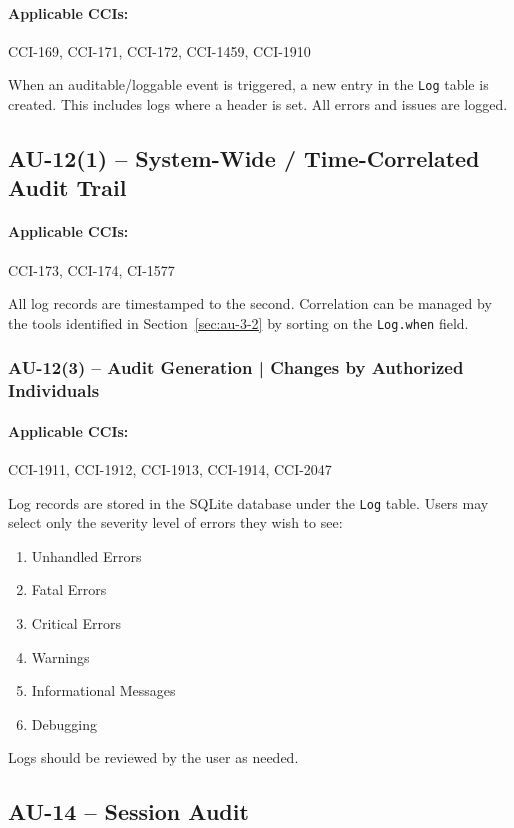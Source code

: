 \documentclass[letterpaper, 10pt, twoside]{article}
\begin{document}
\paragraph{Applicable CCIs:} CCI-169, CCI-171, CCI-172, CCI-1459, CCI-1910

When an auditable/loggable event is triggered, a new entry in the \texttt{Log} table is created. This includes logs where a header is set. All errors and issues are logged.

\subsection{AU-12(1) -- System-Wide / Time-Correlated Audit Trail}

\paragraph{Applicable CCIs:} CCI-173, CCI-174, CI-1577

All log records are timestamped to the second. Correlation can be managed by the tools identified in Section~\ref{sec:au-3-2} by sorting on the \texttt{Log.when} field.

\subsubsection{AU-12(3) -- Audit Generation | Changes by Authorized Individuals}
\label{au-12-3}

\paragraph{Applicable CCIs:} CCI-1911, CCI-1912, CCI-1913, CCI-1914, CCI-2047

Log records are stored in the SQLite database under the \texttt{Log} table. Users may select only the severity level of errors they wish to see:
\begin{enumerate}
	\item Unhandled Errors
	\item Fatal Errors
	\item Critical Errors
	\item Warnings
	\item Informational Messages
	\item Debugging
\end{enumerate}

Logs should be reviewed by the user as needed.

\subsection{AU-14 -- Session Audit}
\end{document}
